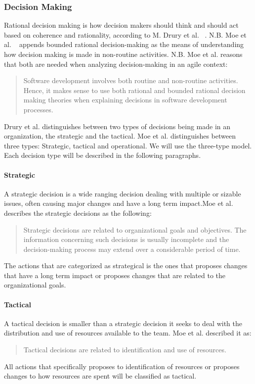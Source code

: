 \subsubsection{Decision Making}
Rational decision making is how decision makers should think and should act based on coherence and rationality, according to M. Drury et al. ~\cite{Drury2012}. N.B. Moe et al. ~\cite{Moe2011} appends bounded rational decision-making as the means of understanding how decision making is made in non-routine activities. N.B. Moe et al. reasons that both are needed when analyzing decision-making in an agile context:
\begin{quote}
Software development involves both routine and non-routine activities. Hence, it makes sense to use both rational and bounded rational decision making theories when explaining decisions in software development processes. 
\end{quote}
Drury et al. distinguishes between two types of decisions being made in an organization, the strategic and the tactical. Moe et al. distinguishes between three types: Strategic, tactical and operational. We will use the three-type model. Each decision type will be described in the following paragraphs. 
\paragraph{Strategic}
A strategic decision is a wide ranging decision dealing with multiple or sizable issues, often causing major changes and have a long term impact.Moe et al. describes the strategic decisions as the following: 
\begin{quote}
Strategic decisions are related to organizational goals and objectives. The information concerning such decisions is usually incomplete and the decision-making process may extend over a considerable period of time.
\end{quote}
The actions that are categorized as strategical is the ones that proposes changes that have a long term impact or proposes changes that are related to the organizational goals. 
\paragraph{Tactical}
A tactical decision is smaller than a strategic decision it seeks to deal with the distribution and use of resources available to the team. Moe et al. described it as: 
\begin{quote}
Tactical decisions are related to identification and use of resources.
\end{quote}
All actions that specifically proposes to identification of resources or proposes changes to how resources are spent will be classified as tactical.
